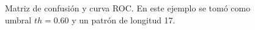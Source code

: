 \begin{figure}
	\centering
	\caption{Matriz de confusión y curva ROC. En este ejemplo se tomó como umbral $th=0.60$ y un patrón de longitud 17.} \label{fig:1d-experiment-060}
\end{figure}

